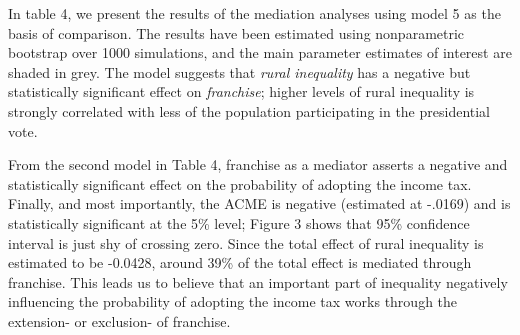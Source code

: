 \documentclass[letter, 12pt]{article}
\begin{document}
In table 4, we present the results of the mediation analyses using model 5 as the basis of comparison. The results have been estimated using nonparametric bootstrap over 1000 simulations, and the main parameter estimates of interest are shaded in grey. The model suggests that \emph{rural inequality} has a negative but statistically significant effect on \emph{franchise}; higher levels of rural inequality is strongly correlated with less of the population participating in the presidential vote. 

From the second model in Table 4, franchise as a mediator asserts a negative and statistically significant effect on the probability of adopting the income tax. Finally, and most importantly, the ACME is negative (estimated at -.0169) and is statistically significant at the 5\% level; Figure 3 shows that 95\% confidence interval is just shy of crossing zero. Since the total effect of rural inequality is estimated to be -0.0428, around 39\% of the total effect is mediated through franchise. This leads us to believe that an important part of inequality negatively influencing the probability of adopting the income tax works through the extension- or exclusion- of franchise.



\end{document}
